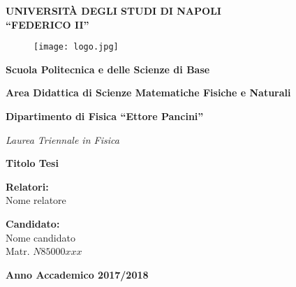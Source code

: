 \documentclass[a4paper,12pt,openright,oneside]{book}
\begin{document}
 
\begin{titlepage}


\begin{center}
	{\Large {\bf UNIVERSIT\`A DEGLI STUDI DI NAPOLI\\
			\vspace{10pt}
			``FEDERICO II''}}
\end{center} 

\begin{figure}[h]
		\begin{center}
			
\texttt{[image: logo.jpg]}    %
		\end{center}
	\end{figure}
	  
	\begin{center}
		\bf{Scuola Politecnica e delle Scienze di Base}
	\end{center}
	\begin{center}
		\bf{Area Didattica di Scienze Matematiche Fisiche e Naturali}
	\end{center}
	\vspace{5pt}
	\begin{center}
		\textbf{Dipartimento di Fisica \textquotedblleft Ettore Pancini\textquotedblright}
	\end{center}
	\vspace{40pt}
	\begin{center}
		{{ \textit{Laurea Triennale in Fisica}}}
	\end{center}
	\vspace{15pt}
	
	
	\begin{center}
		{\Large{\bf{Titolo Tesi}}}
	\end{center}
	
	
	
	
	\vspace{25mm}
	\par
	\noindent
	\begin{minipage}[t]{0.47\textwidth}
		\textbf{Relatori:}\\
		Nome relatore\\    %
	\end{minipage}
	\hfill
	\begin{minipage}[t]{0.47\textwidth}\raggedleft
		\textbf{Candidato:}\\
		Nome candidato\\ %
		Matr. $N85000xxx$ 
	\end{minipage}
	\vspace{5.5mm}
	\begin{center}
		{\large{\bf Anno Accademico 2017/2018}} %
	\end{center}
\end{titlepage}
\end{document}
